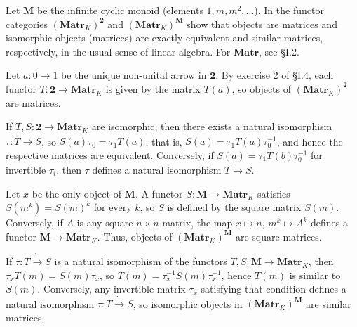 \begin{exercise}
Let $\mathbf{M}$ be the infinite cyclic monoid (elements $1,m,m^2,\ldots$). In the functor categories $(\mathbf{Matr}_K)^\mathbf{2}$ and $(\mathbf{Matr}_K)^\mathbf{M}$ show that objects are matrices and isomorphic objects (matrices) are exactly equivalent and similar matrices, respectively, in the usual sense of linear algebra. For $\mathbf{Matr}$, see \S I.2.
\end{exercise}
\begin{solution}
Let $a:0\to 1$ be the unique non-unital arrow in $\mathbf{2}$. By exercise 2 of \S I.4, each functor $T:\mathbf{2}\to\mathbf{Matr}_K$ is given by the matrix $T(a)$, so objects of $(\mathbf{Matr}_K)^\mathbf{2}$ are matrices.

If $T,S:\mathbf{2}\to\mathbf{Matr}_K$ are isomorphic, then there exists a natural isomorphism $\tau:T\dot{\to}S$, so $S(a)\tau_0=\tau_1T(a)$, that is, $S(a)=\tau_1 T(a)\tau_0^{-1}$, and hence the respective matrices are equivalent. Conversely, if $S(a)=\tau_1 T(b)\tau_0^{-1}$ for invertible $\tau_i$, then $\tau$ defines a natural isomorphism $T\dot{\to} S$.

Let $x$ be the only object of $\mathbf{M}$. A functor $S:\mathbf{M}\to\mathbf{Matr}_K$ satisfies $S(m^k)=S(m)^k$ for every $k$, so $S$ is defined by the square matrix $S(m)$. Conversely, if $A$ is any square $n\times n$ matrix, the map $x\mapsto n$, $m^k\mapsto A^k$ defines a functor $\mathbf{M}\to\mathbf{Matr}_K$. Thus, objects of $(\mathbf{Matr}_K)^\mathbf{M}$ are square matrices.

If $\tau:T\dot{\to} S$ is a natural isomorphism of the functors $T,S:\mathbf{M}\to\mathbf{Matr}_K$, then $\tau_xT(m)=S(m)\tau_x$, so $T(m)=\tau_x^{-1}S(m)\tau_x^{-1}$, hence $T(m)$ is similar to $S(m)$. Conversely, any invertible matrix $\tau_x$ satisfying that condition defines a natural isomorphism $\tau:T\dot{\to}S$, so isomorphic objects in $(\mathbf{Matr}_K)^\mathbf{M}$ are similar matrices.
\end{solution}

